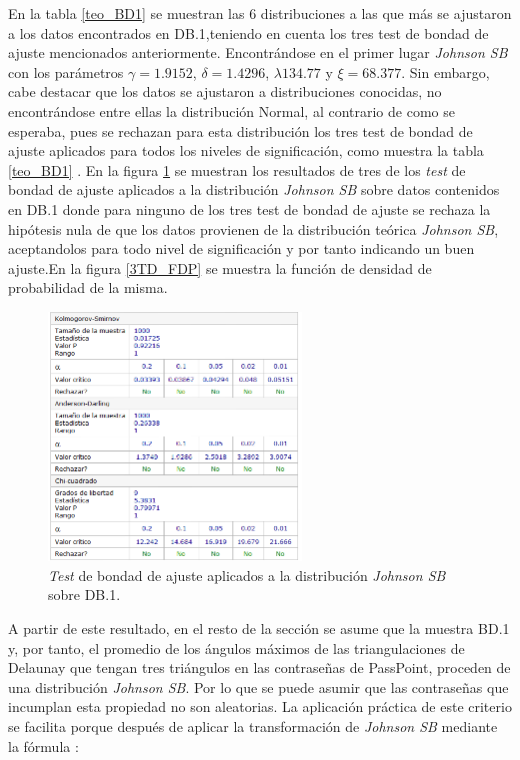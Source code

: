 \documentclass[12pt]{report}
\begin{document}
	 En la tabla \ref{teo_BD1}  se muestran las 6 distribuciones a las que más se ajustaron a los datos encontrados en DB.1,teniendo en cuenta los tres test de bondad de ajuste mencionados anteriormente. Encontrándose en el primer lugar \textit{Johnson SB} con los parámetros $\gamma=1.9152$, $\delta=1.4296$, $\lambda134.77$ y $\xi=68.377$.  Sin embargo, cabe destacar que los datos se ajustaron a  distribuciones conocidas, no encontrándose entre ellas la distribución Normal, al contrario de como se esperaba, pues se rechazan para esta distribución los tres test de bondad de ajuste aplicados para todos los niveles de significación, como muestra la tabla \ref{teo_BD1} . En la figura \ref{3TD_BONDAD} se  muestran los resultados de tres de los \textit{test} de bondad de ajuste aplicados a la distribución \textit{Johnson SB} sobre  datos contenidos en DB.1 donde  para ninguno de los tres test de bondad de ajuste  se rechaza la hipótesis nula de que los datos provienen de la distribución teórica \textit{Johnson SB}, aceptandolos para todo nivel de significación  y por tanto indicando un buen ajuste.En la figura \ref{3TD_FDP}  se muestra la función de densidad de probabilidad de la misma.
	  	\begin{figure}[ht]
	  	\centering
	  	
 	  	\includegraphics[width=0.6\textwidth]{3td_BONDAD.png}
	  	\caption{\textit{Test} de bondad de ajuste aplicados a la distribución \textit{Johnson SB} sobre DB.1.}
	  	\label{3TD_BONDAD}
	  \end{figure}
	  
	  
	 
	 A partir de este resultado, en el resto de la sección se asume que la muestra BD.1 y, por tanto, el promedio de los ángulos máximos de las triangulaciones de Delaunay que tengan tres triángulos en las contraseñas de PassPoint, proceden de una distribución \textit{Johnson SB}. Por lo que se puede asumir que las contraseñas que incumplan esta propiedad no son aleatorias.
	 La aplicación práctica de este criterio se facilita porque después de  aplicar la transformación de \textit{Johnson SB}  mediante la fórmula \cite{30} :
	 
\end{document}
